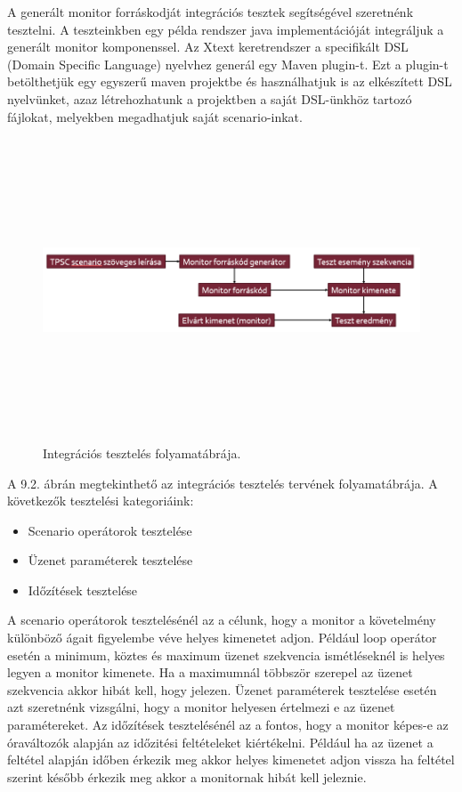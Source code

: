 A generált monitor forráskodját integrációs tesztek segítségével szeretnénk tesztelni.
A teszteinkben egy példa rendszer java implementációját integráljuk a generált monitor komponenssel.
Az Xtext keretrendszer a specifikált DSL (Domain Specific Language) nyelvhez generál egy Maven plugin-t.
Ezt a plugin-t betölthetjük egy egyszerű maven projektbe és használhatjuk is az elkészített DSL nyelvünket, azaz létrehozhatunk a projektben a saját DSL-ünkhöz tartozó fájlokat, melyekben megadhatjuk saját scenario-inkat.

\begin{figure}[!ht]
    \centering
    \includegraphics[width=150mm, height=9cm, keepaspectratio]{figures/integration_test_flow.png}
    \caption{Integrációs tesztelés folyamatábrája.}
\end{figure}

A 9.2. ábrán megtekinthető az integrációs tesztelés tervének folyamatábrája.
A következők tesztelési kategoriáink:

\begin{itemize}
    \item Scenario operátorok tesztelése
    \item Üzenet paraméterek tesztelése
    \item Időzítések tesztelése
\end{itemize}

A scenario operátorok tesztelésénél az a célunk, hogy a monitor a követelmény különböző ágait figyelembe véve helyes kimenetet adjon.
Például loop operátor esetén a minimum, köztes és maximum üzenet szekvencia ismétléseknél is helyes legyen a monitor kimenete.
Ha a maximumnál többször szerepel az üzenet szekvencia akkor hibát kell, hogy jelezen.
Üzenet paraméterek tesztelése esetén azt szeretnénk vizsgálni, hogy a monitor helyesen értelmezi e az üzenet paramétereket.
Az időzítések tesztelésénél az a fontos, hogy a monitor képes-e az óraváltozók alapján az időzitési feltételeket kiértékelni.
Például ha az üzenet a feltétel alapján időben érkezik meg akkor helyes kimenetet adjon vissza ha feltétel szerint később érkezik meg akkor a monitornak hibát kell jeleznie.

